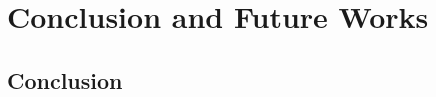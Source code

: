 \chapter{Conclusion and Future Works}
\label{chap:conclusion_future_work}
\minitoc

\thispagestyle{empty}

\newpage
\section{Conclusion}
%
%
%
